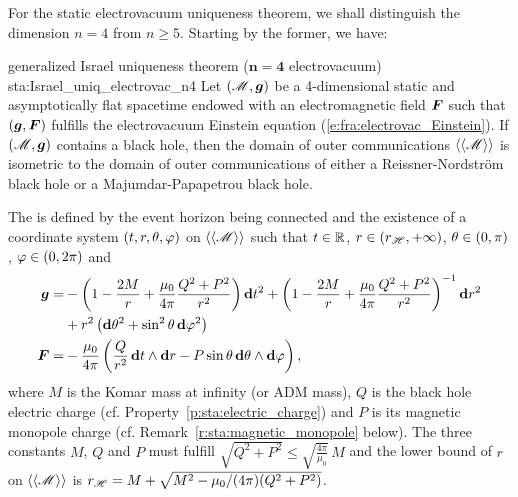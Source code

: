 For the static electrovacuum uniqueness theorem, we shall distinguish
the dimension $n=4$ from $n \geq 5$. Starting by the former, we have:

\begin{tprop}{generalized Israel uniqueness theorem ($\bm{n = 4}$ electrovacuum)
}{sta:Israel_uniq_electrovac_n4}
Let $(\mathscr{M},\bm{g})$ be a 4-dimensional static and asymptotically flat spacetime
endowed with an electromagnetic field $\bm{F}$
such that
$(\bm{g},\bm{F})$ fulfills the electrovacuum Einstein equation (\ref{e:fra:electrovac_Einstein}).
If $(\mathscr{M},\bm{g})$ contains a black hole, then the domain of outer communications $\langle\langle \mathscr{M}\rangle\rangle$ is isometric
to the domain of outer communications of either a Reissner-Nordström black hole or a Majumdar-Papapetrou black hole.

The  is defined by the event horizon being connected and
the existence of a
coordinate system $(t,r,\theta,\varphi)$ on $\langle\langle \mathscr{M}\rangle\rangle$ such
that $t\in\mathbb{R}$, $r\in (r_{\mathscr{H}},+\infty)$, $\theta \in (0,\pi)$,
$\varphi\in (0, 2\pi)$ and
\begin{subequations}
\label{e:sta:ReiNor_n4}
\begin{align}
    \bm{g}  = & -\left( 1 - \frac{2 M}{r} + \frac{\mu_0}{4\pi} \frac{Q^2 + P^2}{r^2} \right) \mathbf{d} t^2
    + \left( 1 - \frac{2 M}{r} + \frac{\mu_0}{4\pi} \frac{Q^2 + P^2}{r^2} \right) ^{-1} \mathbf{d} r^2
    \nonumber \\
    &  + r^2 \left( \mathbf{d}\theta^2 + \sin^2\theta\, \mathbf{d}\varphi^2 \right) \label{e:sta:g_ReiNor_n4} \\
    \bm{F}  = & - \frac{\mu_0}{4\pi} \left( \frac{Q}{r^2}\,  \mathbf{d} t \wedge \mathbf{d} r
     - P \sin\theta \, \mathbf{d} \theta \wedge\mathbf{d} \varphi \right) , \label{e:sta:F_ReiNor_n4}
\end{align}
\end{subequations}
where $M$ is the Komar mass at infinity
(or ADM mass), $Q$ is the black hole electric charge (cf. Property~\ref{p:sta:electric_charge})
and
$P$ is its magnetic monopole charge (cf. Remark~\ref{r:sta:magnetic_monopole} below).
The three constants $M$, $Q$ and $P$ must fulfill
$\sqrt{Q^2 + P^2} \leq \sqrt{\frac{4\pi}{\mu_0}}\, M$
and the lower bound of $r$ on $\langle\langle \mathscr{M}\rangle\rangle$ is
 $r_{\mathscr{H}} = M + \sqrt{M^2 - \mu_0/(4\pi)(Q^2 + P^2)}$.


\end{tprop}
